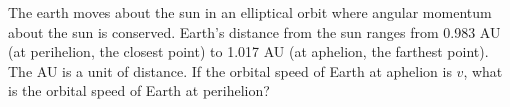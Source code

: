 The earth moves about the sun in an elliptical orbit where angular
momentum about the sun is conserved. Earth's distance from the sun
ranges from 0.983 AU (at perihelion, the closest point) to 1.017
AU (at aphelion, the farthest point). The AU is a unit of distance. If the orbital speed of
Earth at aphelion is $v$, what is the orbital speed of Earth at
perihelion?
